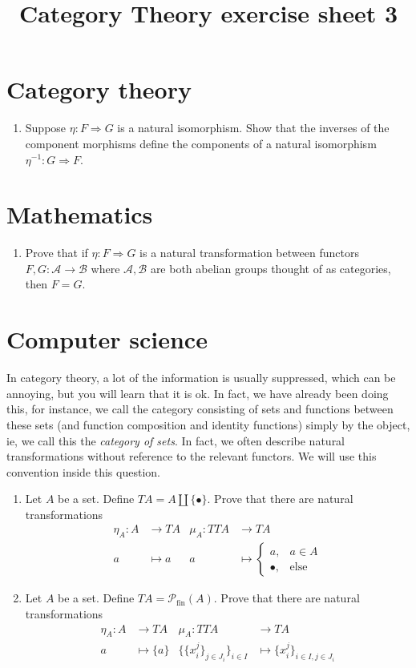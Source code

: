 \documentclass[12pt]{article}
\title{Category Theory exercise sheet 3}
\theoremstyle{plain}
\theoremstyle{definition}
\newcommand{\call}[1]{\mathcal{#1}}
\newcommand{\lto}{\longrightarrow}
\begin{document}
	
	\maketitle
	
	\section{Category theory}
	\begin{enumerate}
		\item Suppose $\eta: F \Rightarrow G$ is a natural isomorphism. Show that the inverses of the component morphisms define the components of a natural isomorphism $\eta^{-1}: G \Rightarrow F$.
		\end{enumerate}
	
	\section{Mathematics}
	\begin{enumerate}
		\item Prove that if $\eta: F \Rightarrow G$ is a natural transformation between functors $F,G: \call{A} \lto \call{B}$ where $\call{A}, \call{B}$ are both abelian groups thought of as categories, then $F = G$.
		\end{enumerate}
	
	\section{Computer science}
	In category theory, a lot of the information is usually suppressed, which can be annoying, but you will learn that it is ok. In fact, we have already been doing this, for instance, we call the category consisting of sets and functions between these sets (and function composition and identity functions) simply by the object, ie, we call this the \emph{category of sets}. In fact, we often describe natural transformations without reference to the relevant functors. We will use this convention inside this question.
	\begin{enumerate}
		\item Let $A$ be a set. Define $TA = A \coprod \{ \bullet \}$. Prove that there are natural transformations
		\begin{align*}
			\eta_A: A &\lto TA & \mu_A: TTA &\lto TA\\
			a &\longmapsto a & a &\longmapsto
			\begin{cases}
				a, & a \in A\\
				\bullet, & \text{else}
				\end{cases}
			\end{align*}
		\item Let $A$ be a set. Define $TA = \call{P}_{\text{fin}}(A)$. Prove that there are natural transformations
		\begin{align*}
			\eta_A: A &\lto TA & \mu_A: TTA &\lto TA\\
			a &\longmapsto \{ a \} & \{ \{ x_i^j \}_{j \in J_i} \}_{i \in I} &\longmapsto \{ x_i^j \}_{i \in I, j \in J_i}
			\end{align*}
		\end{enumerate}
	
\end{document}
